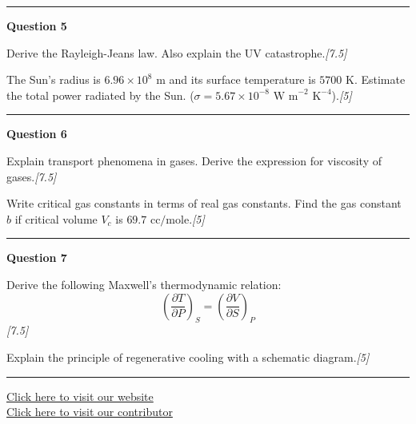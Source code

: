 \documentclass[11pt,a4paper]{article}
\newcommand{\pts}[1]{\hfill   \textit{[#1]}}
\begin{document}
\medskip\rule{\linewidth}{0.2pt}\medskip




\noindent   \textbf{Question 5}

\begin{parts}
  \item Derive the Rayleigh-Jeans law. Also explain the UV catastrophe.\pts{7.5}
  \item The Sun's radius is $6.96  \times 10^8 \text{ m}$ and its surface temperature is $5700 \text{ K}$. Estimate the total power radiated by the Sun. ($\sigma = 5.67  \times 10^{-8} \text{ W m}^{-2} \text{ K}^{-4}$).\pts{5}
\end{parts}

\medskip\rule{\linewidth}{0.2pt}\medskip




\noindent   \textbf{Question 6}

\begin{parts}
  \item Explain transport phenomena in gases. Derive the expression for viscosity of gases.\pts{7.5}
  \item Write critical gas constants in terms of real gas constants. Find the gas constant $b$ if critical volume $V_c$ is $69.7 \text{ cc/mole}$.\pts{5}
\end{parts}

\medskip\rule{\linewidth}{0.2pt}\medskip




\noindent   \textbf{Question 7}

\begin{parts}
  \item Derive the following Maxwell's thermodynamic relation:
  \[
  \left(\frac{\partial T}{\partial P}\right)_S = \left(\frac{\partial V}{\partial S}\right)_P
  \]\pts{7.5}
  \item Explain the principle of regenerative cooling with a schematic diagram.\pts{5}
\end{parts}

\vfill\rule{\linewidth}{0.4pt}

\begin{center}\small
\href{https://bhu-exam.vercel.app/}{Click here to visit our website}\\[4pt]
\href{https://me-aryan.vercel.app/}{Click here to visit our contributor}
\end{center}
\end{document}

